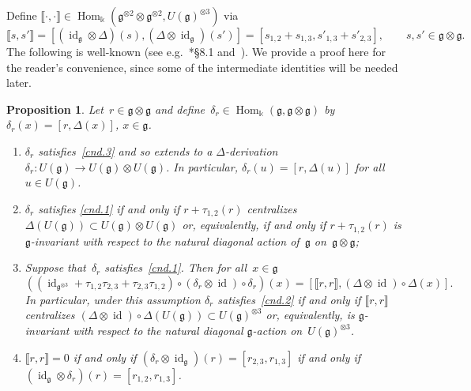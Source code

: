 \documentclass[12pt, reqno]{amsart}
\newcommand{\cybe}[1]{\mathbb{\Lbrack}#1,#1\mathbb{\Rbrack}}
\newcommand{\cyb}[2]{\mathbb{\Lbrack}#1,#2\mathbb{\Rbrack}}
\newtheorem{proposition}[theorem]{Proposition}
\theoremstyle{definition}
\numberwithin{equation}{section}
\newcommand{\tensor}{\otimes}
\newcommand{\kk}{\mathbb{k}}\newcommand{\lie}[1]{{\mathfrak{#1}}}
\newenvironment{enumalph}{\begin{enumerate}[label={\rm(\alph*)},leftmargin=*]}{\end{enumerate}}
\DeclareMathOperator{\id}{id}
\DeclareMathOperator{\Hom}{Hom}
\begin{document}
Define $\cyb{\cdot}{\cdot}\in\Hom_\kk(\lie g^{\tensor 2}\tensor\lie g^{\tensor 2},U(\lie g)^{\tensor 3})$ via
$$
\cyb{s}{s'}=
[(\id_{\lie g}\tensor\Delta)(s),(\Delta\tensor\id_{\lie g})(s')]=[s_{1,2}+s_{1,3},s'_{1,3}+s'_{2,3}],\qquad s,s'\in \lie g\tensor\lie g.
$$
The following is well-known
(see e.g.~\cite{Majid}*{\S8.1} and~\cites{Drinf,EK-I,EK-II,EK-III}).
We provide a proof here for the reader's convenience, since some of the intermediate identities will be 
needed later. 
\begin{proposition}\label{prop:compat cond}
Let~$r\in \lie g\tensor\lie g$ and define~$\delta_{r}\in\Hom_\kk(\lie g, \lie g\tensor \lie g)$ by $\delta_{r}(x)=
[r,\Delta(x)]$, $x\in\lie g$.
\begin{enumalph}
\item\label{prop:compat cond.a} 
$\delta_{r}$ satisfies~\ref{cnd.3}
and so extends to a $\Delta$-derivation
$\delta_{r}:U(\lie g)\to U(\lie g)\tensor U(\lie g)$. In particular,
$\delta_{r}(u)=[r,\Delta(u)]$ for all~$u\in U(\lie g)$.
\item\label{prop:compat cond.b}
$\delta_{r}$ satisfies
\ref{cnd.1} if and only if $r+\tau_{1,2}(r)$ centralizes 
$\Delta(U(\lie g))\subset U(\lie g)\tensor U(\lie g)$ or, equivalently, if and only
if $r+\tau_{1,2}(r)$ is
$\lie g$-invariant with respect to the natural
diagonal action of~$\lie g$ on~$\lie g\tensor\lie g$; 
\item\label{prop:compat cond.c} 
Suppose that~$\delta_{r}$ satisfies~\ref{cnd.1}. Then
for all~$x\in\lie g$
$$
((\id_{\lie g^{\tensor 3}}+\tau_{1,2}\tau_{2,3}+\tau_{2,3}\tau_{1,2})\circ(\delta_{r}\tensor\id)\circ\delta_{r})(x)=
[\cybe{r},(\Delta\tensor\id)\circ\Delta(x)].
$$
In particular, under this assumption $\delta_{r}$ satisfies~\ref{cnd.2} if and only if
$\cybe{r}$ centralizes 
$(\Delta\tensor\id)\circ\Delta(U(\lie g))\subset U(\lie g)^{\tensor 3}$
or, equivalently, is $\lie g$-invariant
with respect to the natural diagonal 
$\lie g$-action on~$U(\lie g)^{\tensor 3}$.
\item\label{prop:compat cond.d}
$\cybe{r}=0$ if and only if $(\delta_{r}\tensor\id_{\lie g})(r)=[r_{2,3},r_{1,3}]$ if and only if
$(\id_{\lie g}\tensor \delta_{r})(r)=[r_{1,2},
r_{1,3}]$.
\end{enumalph}
\end{proposition}
\end{document}
